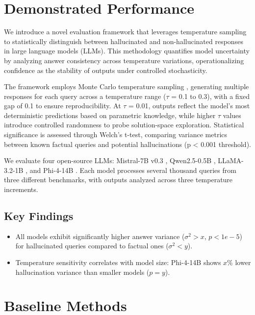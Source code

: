 \documentclass[sigconf]{acmart}
\begin{document}
\section{Demonstrated Performance}

We introduce a novel evaluation framework that leverages temperature sampling to statistically distinguish between hallucinated and non-hallucinated responses in large language models (LLMs). This methodology quantifies model uncertainty by analyzing answer consistency across temperature variations, operationalizing confidence as the stability of outputs under controlled stochasticity.

The framework employs Monte Carlo temperature sampling \cite{monte_carlo_temperature}, generating multiple responses for each query across a temperature range ($\tau$ = 0.1 to 0.3), with a fixed gap of 0.1 to ensure reproducibility. At $\tau$ = 0.01, outputs reflect the model's most deterministic predictions based on parametric knowledge, while higher $\tau$ values introduce controlled randomness to probe solution-space exploration. Statistical significance is assessed through Welch's t-test, comparing variance metrics between known factual queries and potential hallucinations (p < 0.001 threshold).

We evaluate four open-source LLMs: Mistral-7B v0.3 \cite{mistral_7b}, Qwen2.5-0.5B \cite{Qwen2.5}, LLaMA-3.2-1B \cite{llama_3.2}, and Phi-4-14B \cite{phi_4}. Each model processes several thousand queries from three different benchmarks, with outputs analyzed across three temperature increments.

\subsection{Key Findings}
\begin{itemize}
    \item All models exhibit significantly higher answer variance ($\sigma^2 > x$, $p < 1e-5$) for hallucinated queries compared to factual ones ($\sigma^2 < y$).
    \item Temperature sensitivity correlates with model size: Phi-4-14B shows $x\%$ lower hallucination variance than smaller models ($p = y$).
\end{itemize}


\section{Baseline Methods}
\end{document}
